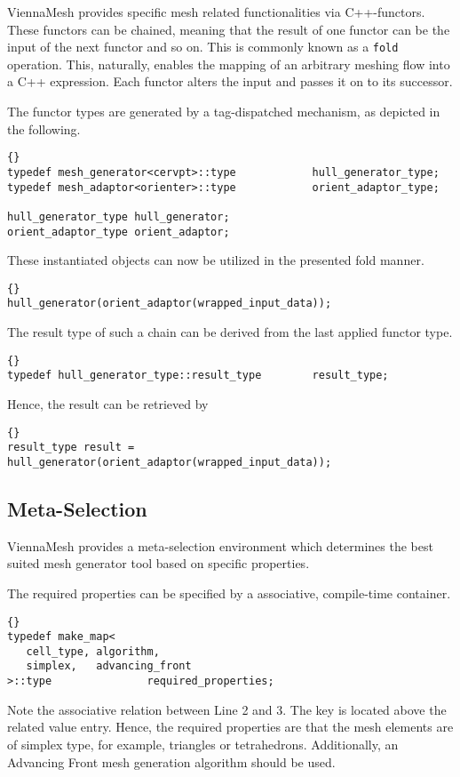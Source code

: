 ViennaMesh provides specific mesh related functionalities via C++-functors. 
These functors can be chained, meaning that the result of one functor 
can be the input of the next functor and so on. This is commonly known as 
a \texttt{fold} operation.
This, naturally, enables the mapping of an arbitrary meshing flow into 
a C++ expression. Each functor alters the input and passes it on to its 
successor. 

The functor types are generated by a tag-dispatched mechanism, 
as depicted in the following.

\begin{lstlisting}{}
typedef mesh_generator<cervpt>::type            hull_generator_type;
typedef mesh_adaptor<orienter>::type            orient_adaptor_type;

hull_generator_type hull_generator;
orient_adaptor_type orient_adaptor;
\end{lstlisting}

These instantiated objects can now be utilized in the presented fold manner.
\begin{lstlisting}{}
hull_generator(orient_adaptor(wrapped_input_data));
\end{lstlisting}

The result type of such a chain can be derived from the last applied functor type.
\begin{lstlisting}{}
typedef hull_generator_type::result_type        result_type;
\end{lstlisting}

Hence, the result can be retrieved by
\begin{lstlisting}{}
result_type result = hull_generator(orient_adaptor(wrapped_input_data));
\end{lstlisting}

\subsection{Meta-Selection}

ViennaMesh provides a meta-selection environment which determines the 
best suited mesh generator tool based on specific properties. 

The required properties can be specified by a associative, compile-time container.
\begin{lstlisting}{}
typedef make_map<
   cell_type, algorithm,      
   simplex,   advancing_front
>::type               required_properties;
\end{lstlisting}
Note the associative relation between Line 2 and 3. The key is located 
above the related value entry. Hence, the required properties are that 
the mesh elements are of simplex type, for example, triangles or tetrahedrons.
Additionally, an Advancing Front mesh generation algorithm should be used.

